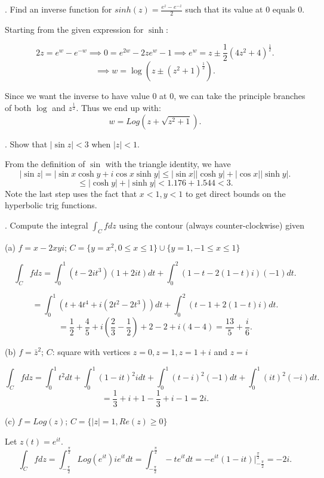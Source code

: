 \documentclass[letterpaper, reqno,11pt]{article}
\begin{document}
\medskip

. Find an inverse function for $ sinh (z)=\frac{e^z-e^{-z}}{2}$ such that its value at $0$ equals $0$.

Starting from the given expression for $\sinh$: 

\[
2z=e^{w}-e^{-w}\implies 0=e^{2w}-2ze^{w}-1\implies e^{w}=z\pm \frac{1}{2}(4z^2+4)^{\frac{1}{2}}
.\]
\[
\implies w=\log\left( z\pm \left( z^2+1 \right)^{\frac{1}{2}} \right) 
.\]

Since we want the inverse to have value 0 at 0, we can take the principle branches of both $\log$ and $z^{\frac{1}{2}}$. Thus we end up with: 
\[
w=Log\left( z+\sqrt{ z^2+1 } \right)
.\]


\medskip

. Show that $|\sin z| < 3$ when $|z|<1$.

\medskip

From the definition of $\sin$ with the triangle identity, we have
\[
|\sin z|=|\sin x\cosh y+i\cos x\sinh y|\leq  |\sin x| |\cosh y|+|\cos x||\sinh y|
.\]
\[
\leq |\cosh y|+|\sinh y|<1.176+1.544<3
.\]
Note the last step uses the fact that $x<1, y<1$ to get direct bounds on the hyperbolic trig functions. 


. Compute the integral $ \int_{C} f dz$  using the contour (always counter-clockwise) given

(a) $ f= x-2xy i$; $ C=\{ y=x^2, 0\leq x \leq 1 \} \cup  \{ y=1, -1\leq x \leq 1 \} $

\[
\int_Cfdz=\int_0^1 (t-2it^3)(1+2it)dt+\int_0^2 \left( 1-t-2(1-t)i \right) (-1)dt
.\]

\[
=\int_0^1 \left( t+4t ^{4}+i(2t^2-2t^3) \right) dt+\int_0^2 \left(t-1+2(1-t)i \right) dt
.\]
\[
=\frac{1}{2}+\frac{4}{5}+i\left( \frac{2}{3}-\frac{1}{2} \right) +2-2+i(4-4)=\frac{13}{5}+\frac{i}{6}
.\]

(b) $f=\bar{z}^2 $; $C$: square with vertices $ z=0, z=1, z=1+i$ and $ z=i$

\[
\int_C fdz=\int_0^{1}t^2dt+\int_0^{1}\left( 1-it \right) ^2idt+\int_0^{1}\left( t-i \right) ^2(-1)dt+\int_0^{1}\left( it \right) ^2(-i)dt
.\]
\[
=\frac{1}{3}+i+1-\frac{1}{3}+i-1=2i
.\]

(c) $ f=Log (z)$; $C=\{ |z|=1, Re(z) \geq 0 \}$

Let $z(t)=e^{it}$. 
\[
\int_C fdz=\int_{-\frac{\pi}{2}}^{\frac{\pi}{2}}Log(e^{it})ie^{it}dt=\int_{-\frac{\pi}{2}}^{\frac{\pi}{2}}-te^{it}dt=-e^{it}(1-it)\bigg|_{-\frac{\pi}{2}}^{\frac{\pi}{2}}=-2i
.\]
\end{document}
